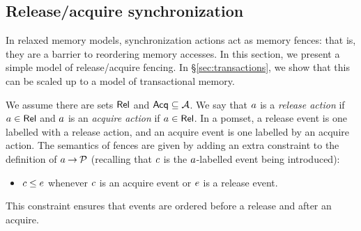 \subsection{Release/acquire synchronization}
\label{sec:ra}

In relaxed memory models, synchronization actions act as memory fences: that
is, they are a barrier to reordering memory accesses.  In this section, we
present a simple model of release/acquire fencing. In
\S\ref{sec:transactions}, we show that this can be scaled up to a model of
transactional memory.

We assume there are sets $\mathsf{Rel}$ and $\mathsf{Acq} \subseteq\mathcal{A}$.  We say that
$a$ is a \emph{release action} if $a\in\mathsf{Rel}$ and $a$ is an
\emph{acquire action} if $a\in\mathsf{Rel}$.
In a pomset, a release event is one labelled with a release action,
and an acquire event is one labelled by an acquire action.
The semantics of fences are given by adding an extra constraint
to the definition of $a\mathbin\rightarrow\mathcal{P}$
(recalling that $c$ is the $a$-labelled event being introduced):
\begin{itemize}
\item $c \le e$ whenever $c$ is an acquire event or $e$ is a release event.
\end{itemize}
This constraint ensures that events are ordered before a
release and after an acquire.


